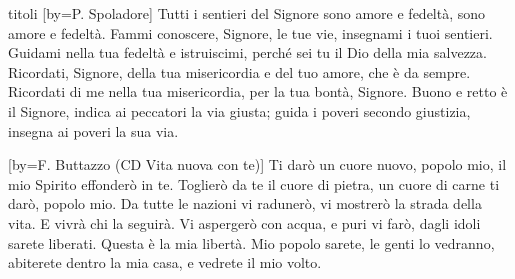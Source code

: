 \begin{songs}{titoli}
[by={P. Spoladore}]
\beginchorus
Tutti i sentieri del Signore
sono amore e fedeltà, sono amore e fedeltà.
\endchorus
\beginverse
Fammi conoscere, Signore, le tue vie,
insegnami i tuoi sentieri.
Guidami nella tua fedeltà e istruiscimi,
perché sei tu il Dio della mia salvezza.
\endverse
\beginverse
Ricordati, Signore, della tua misericordia
e del tuo amore, che è da sempre.
Ricordati di me nella tua misericordia,
per la tua bontà, Signore.
\endverse
\beginverse
Buono e retto è il Signore,
indica ai peccatori la via giusta;
guida i poveri secondo giustizia,
insegna ai poveri la sua via.
\endverse
\endsong

[by={F. Buttazzo (CD Vita nuova con te)}]
\beginchorus
Ti darò un cuore nuovo, popolo mio,
il mio Spirito effonderò in te.
Toglierò da te il cuore di pietra,
un cuore di carne ti darò, popolo mio.
\endchorus
\beginverse
Da tutte le nazioni vi radunerò,
vi mostrerò la strada della vita.
E vivrà chi la seguirà.
\endverse
\beginverse
Vi aspergerò con acqua, e puri vi farò,
dagli idoli sarete liberati.
Questa è la mia libertà.
\endverse
\beginverse
Mio popolo sarete, le genti lo vedranno,
abiterete dentro la mia casa,
e vedrete il mio volto.
\endverse
\endsong

\end{songs}
